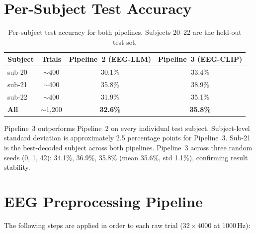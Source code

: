 \documentclass{article}
\begin{document}
\section{Per-Subject Test Accuracy}
\label{app:per_subject}

\begin{table}[h]
  \centering
  \caption{Per-subject test accuracy for both pipelines. Subjects 20--22 are the held-out test set.}
  \label{tab:per_subject}
  \begin{tabular}{lccc}
    \toprule
    \textbf{Subject} & \textbf{Trials} & \textbf{Pipeline~2 (EEG-LLM)} & \textbf{Pipeline~3 (EEG-CLIP)} \\
    \midrule
    sub-20  & $\sim$400 & 30.1\% & 33.4\% \\
    sub-21  & $\sim$400 & 35.8\% & 38.9\% \\
    sub-22  & $\sim$400 & 31.9\% & 35.1\% \\
    \midrule
    \textbf{All} & $\sim$1{,}200 & \textbf{32.6\%} & \textbf{35.8\%} \\
    \bottomrule
  \end{tabular}
\end{table}

Pipeline~3 outperforms Pipeline~2 on every individual test subject. Subject-level standard deviation is approximately 2.5 percentage points for Pipeline~3. Sub-21 is the best-decoded subject across both pipelines. Pipeline~3 across three random seeds (0, 1, 42): 34.1\%, 36.9\%, 35.8\% (mean 35.6\%, std 1.1\%), confirming result stability.

\section{EEG Preprocessing Pipeline}
\label{app:preprocessing}

The following steps are applied in order to each raw trial ($32 \times 4000$ at 1000\,Hz):
\end{document}
